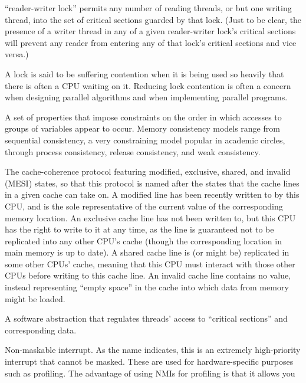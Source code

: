 \begin{description}
	``reader-writer lock'' permits any number of reading
	threads, or but one writing thread, into the set of critical
	sections guarded by that lock.  (Just to be clear, the presence
	of a writer thread in any of a given reader-writer lock's
	critical sections will prevent any reader from entering
	any of that lock's critical sections and vice versa.)
\item[Lock Contention:]
	A lock is said to be suffering contention when it is being
	used so heavily that there is often a CPU waiting on it.
	Reducing lock contention is often a concern when designing
	parallel algorithms and when implementing parallel programs.
\item[Memory Consistency:]
	A set of properties that impose constraints on the order in
	which accesses to groups of variables appear to occur.
	Memory consistency models range from sequential consistency,
	a very constraining model popular in academic circles, through
	process consistency, release consistency, and weak consistency.
\item[MESI Protocol:]
	The
	cache-coherence protocol featuring
	modified, exclusive, shared, and invalid (MESI) states,
	so that this protocol is named after the states that the
	cache lines in a given cache can take on.
	A modified line has been recently written to by this CPU,
	and is the sole representative of the current value of
	the corresponding memory location.
	An exclusive cache line has not been written to, but this
	CPU has the right to write to it at any time, as the line
	is guaranteed not to be replicated into any other CPU's cache
	(though the corresponding location in main memory is up to date).
	A shared cache line is (or might be) replicated in some other
	CPUs' cache, meaning that this CPU must interact with those other
	CPUs before writing to this cache line.
	An invalid cache line contains no value, instead representing
	``empty space'' in the cache into which data from memory might
	be loaded.
\item[Mutual-Exclusion Mechanism:]
	A software abstraction that regulates threads' access to
	``critical sections'' and corresponding data.
\item[NMI:]
	Non-maskable interrupt.
	As the name indicates, this is an extremely high-priority
	interrupt that cannot be masked.
	These are used for hardware-specific purposes such as profiling.
	The advantage of using NMIs for profiling is that it allows you

\end{description}
